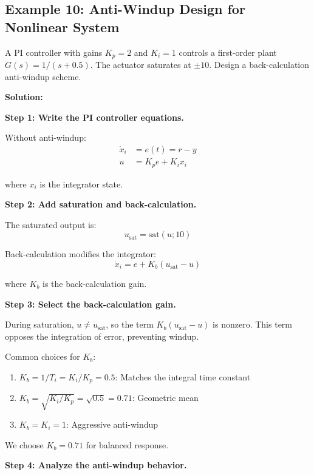 \subsection{Example 10: Anti-Windup Design for Nonlinear System}

\begin{example}
\label{ex:antiwindup_design}
A PI controller with gains $K_p = 2$ and $K_i = 1$ controls a first-order plant $G(s) = 1/(s+0.5)$. The actuator saturates at $\pm 10$. Design a back-calculation anti-windup scheme.

\textbf{Solution:}

\textbf{Step 1: Write the PI controller equations.}

Without anti-windup:
\begin{align}
\dot{x}_i &= e(t) = r - y \\
u &= K_p e + K_i x_i
\end{align}

where $x_i$ is the integrator state.

\textbf{Step 2: Add saturation and back-calculation.}

The saturated output is:
\begin{equation}
u_{\text{sat}} = \text{sat}(u; 10)
\end{equation}

Back-calculation modifies the integrator:
\begin{equation}
\dot{x}_i = e + K_b(u_{\text{sat}} - u)
\end{equation}

where $K_b$ is the back-calculation gain.

\textbf{Step 3: Select the back-calculation gain.}

During saturation, $u \neq u_{\text{sat}}$, so the term $K_b(u_{\text{sat}} - u)$ is nonzero. This term opposes the integration of error, preventing windup.

Common choices for $K_b$:
\begin{enumerate}
    \item $K_b = 1/T_i = K_i/K_p = 0.5$: Matches the integral time constant
    \item $K_b = \sqrt{K_i/K_p} = \sqrt{0.5} = 0.71$: Geometric mean
    \item $K_b = K_i = 1$: Aggressive anti-windup
\end{enumerate}

We choose $K_b = 0.71$ for balanced response.

\textbf{Step 4: Analyze the anti-windup behavior.}


\end{example}

